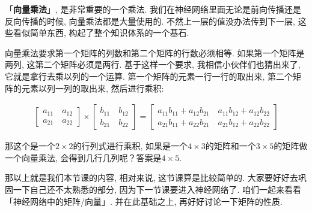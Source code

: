 「\textbf{向量乘法}」, 是非常重要的一个乘法. 我们在神经网络里面无论是前向传播还是反向传播的时候, 向量乘法都是大量使用的. 不然上一层的值没办法传到下一层, 这些看似简单东西, 构起了整个知识体系的一个基石. 

向量乘法要求第一个矩阵的列数和第二个矩阵的行数必须相等. 如果第一个矩阵是两列, 这第二个矩阵必须是两行. 基于这样一个要求, 我相信小伙伴们也猜出来了, 它就是拿行去乘以列的一个运算. 第一个矩阵的元素一行一行的取出来, 第二个矩阵的元素以列一列的取出来, 然后进行乘积: 

\begin{align*}
\begin{bmatrix}
a_{11} \quad a_{12} \\
a_{21} \quad a_{22}
\end{bmatrix}
\times
\begin{bmatrix}
b_{11} \quad b_{12} \\
b_{21} \quad b_{22}
\end{bmatrix}=
\begin{bmatrix}
a_{11}b_{11} + a_{12}b_{21} \quad a_{11}b_{12} + a_{12}b_{22} \\
a_{21}b_{11} + a_{22}b_{21} \quad a_{21}b_{12} + a_{22}b_{22}
\end{bmatrix}
\end{align*}

那这个是一个$2 \times 2$的行列式进行乘积, 如果是一个$4 \times 3$的矩阵和一个$3 \times 5$的矩阵做一个向量乘法, 会得到几行几列呢？答案是$4 \times 5$. 

那以上就是我们本节课的内容, 相对来说, 这节课算是比较简单的. 大家要好好去巩固一下自己还不太熟悉的部分, 因为下一节课要进入神经网络了. 咱们一起来看看「神经网络中的矩阵/向量」. 并在此基础之上, 再好好讨论一下矩阵的性质. 
